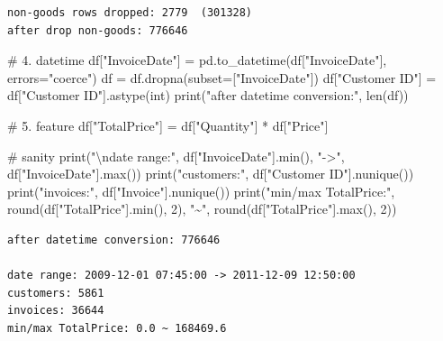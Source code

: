 \documentclass[
]{ctexart}
\newenvironment{Shaded}{\begin{snugshade}}{\end{snugshade}}
\newcommand{\BuiltInTok}[1]{\textcolor[rgb]{0.00,0.23,0.31}{#1}}
\newcommand{\CharTok}[1]{\textcolor[rgb]{0.13,0.47,0.30}{#1}}
\newcommand{\CommentTok}[1]{\textcolor[rgb]{0.37,0.37,0.37}{#1}}
\newcommand{\DecValTok}[1]{\textcolor[rgb]{0.68,0.00,0.00}{#1}}
\newcommand{\NormalTok}[1]{\textcolor[rgb]{0.00,0.23,0.31}{#1}}
\newcommand{\OperatorTok}[1]{\textcolor[rgb]{0.37,0.37,0.37}{#1}}
\newcommand{\StringTok}[1]{\textcolor[rgb]{0.13,0.47,0.30}{#1}}
\begin{document}
\begin{verbatim}
non-goods rows dropped: 2779  (301328)
after drop non-goods: 776646
\end{verbatim}

\begin{Shaded}
\begin{Highlighting}[]
\CommentTok{\# 4. datetime}
\NormalTok{df[}\StringTok{"InvoiceDate"}\NormalTok{] }\OperatorTok{=}\NormalTok{ pd.to\_datetime(df[}\StringTok{"InvoiceDate"}\NormalTok{], errors}\OperatorTok{=}\StringTok{"coerce"}\NormalTok{)}
\NormalTok{df }\OperatorTok{=}\NormalTok{ df.dropna(subset}\OperatorTok{=}\NormalTok{[}\StringTok{"InvoiceDate"}\NormalTok{])}
\NormalTok{df[}\StringTok{"Customer ID"}\NormalTok{] }\OperatorTok{=}\NormalTok{ df[}\StringTok{"Customer ID"}\NormalTok{].astype(}\BuiltInTok{int}\NormalTok{)}
\BuiltInTok{print}\NormalTok{(}\StringTok{"after datetime conversion:"}\NormalTok{, }\BuiltInTok{len}\NormalTok{(df))}

\CommentTok{\# 5. feature}
\NormalTok{df[}\StringTok{"TotalPrice"}\NormalTok{] }\OperatorTok{=}\NormalTok{ df[}\StringTok{"Quantity"}\NormalTok{] }\OperatorTok{*}\NormalTok{ df[}\StringTok{"Price"}\NormalTok{]}

\CommentTok{\# sanity}
\BuiltInTok{print}\NormalTok{(}\StringTok{"}\CharTok{\textbackslash{}n}\StringTok{date range:"}\NormalTok{, df[}\StringTok{"InvoiceDate"}\NormalTok{].}\BuiltInTok{min}\NormalTok{(), }\StringTok{"{-}\textgreater{}"}\NormalTok{, df[}\StringTok{"InvoiceDate"}\NormalTok{].}\BuiltInTok{max}\NormalTok{())}
\BuiltInTok{print}\NormalTok{(}\StringTok{"customers:"}\NormalTok{, df[}\StringTok{"Customer ID"}\NormalTok{].nunique())}
\BuiltInTok{print}\NormalTok{(}\StringTok{"invoices:"}\NormalTok{, df[}\StringTok{"Invoice"}\NormalTok{].nunique())}
\BuiltInTok{print}\NormalTok{(}\StringTok{"min/max TotalPrice:"}\NormalTok{, }\BuiltInTok{round}\NormalTok{(df[}\StringTok{"TotalPrice"}\NormalTok{].}\BuiltInTok{min}\NormalTok{(), }\DecValTok{2}\NormalTok{), }\StringTok{"\textasciitilde{}"}\NormalTok{, }\BuiltInTok{round}\NormalTok{(df[}\StringTok{"TotalPrice"}\NormalTok{].}\BuiltInTok{max}\NormalTok{(), }\DecValTok{2}\NormalTok{))}
\end{Highlighting}
\end{Shaded}

\begin{verbatim}
after datetime conversion: 776646

date range: 2009-12-01 07:45:00 -> 2011-12-09 12:50:00
customers: 5861
invoices: 36644
min/max TotalPrice: 0.0 ~ 168469.6
\end{verbatim}
\end{document}
